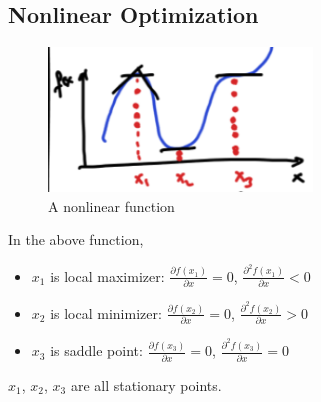 \documentclass[11pt]{article}
\numberwithin{equation}{section}
\begin{document}
\subsection{Nonlinear Optimization}
\begin{figure}[H]
    \centering
    \includegraphics[width = 7cm]{images/9-ex-1.png}
    \caption{A nonlinear function}
\end{figure}
In the above function, \begin{itemize}
    \item $x_1$ is local maximizer: $\frac{\partial f(x_1)}{\partial x}=0$, $\frac{\partial^2 f(x_1)}{\partial x}<0$
    \item $x_2$ is local minimizer: $\frac{\partial f(x_2)}{\partial x}=0$, $\frac{\partial^2 f(x_2)}{\partial x}>0$
    \item $x_3$ is saddle point: $\frac{\partial f(x_3)}{\partial x}=0$, $\frac{\partial^2 f(x_3)}{\partial x}=0$
\end{itemize}
$x_1$, $x_2$, $x_3$ are all stationary points.
\end{document}
